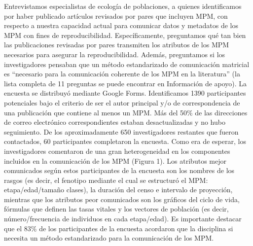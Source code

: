 \documentclass[
]{book}
\theoremstyle{definition}
\theoremstyle{definition}
\theoremstyle{definition}
\theoremstyle{definition}
\theoremstyle{remark}
\begin{document}
Entrevistamos especialistas de ecología de poblaciones, a quienes identificamos por haber publicado artículos revisados por pares que incluyen MPM, con respecto a nuestra capacidad actual para comunicar datos y metadatos de los MPM con fines de reproducibilidad. Específicamente, preguntamos qué tan bien las publicaciones revisadas por pares transmiten los atributos de los MPM necesarios para asegurar la reproducibilidad. Además, preguntamos si los investigadores pensaban que un método estandarizado de comunicación matricial es ``necesario para la comunicación coherente de los MPM en la literatura'' (la lista completa de 11 preguntas se puede encontrar en Información de apoyo). La encuesta se distribuyó mediante Google Forms. Identificamos 1390 participantes potenciales bajo el criterio de ser el autor principal y/o de correspondencia de una publicación que contiene al menos un MPM. Más del 50\% de las direcciones de correo electrónico correspondientes estaban desactualizadas y no hubo seguimiento. De los aproximadamente 650 investigadores restantes que fueron contactados, 60 participantes completaron la encuesta. Como era de esperar, los investigadores comentaron de una gran heterogeneidad en los componentes incluidos en la comunicación de los MPM (Figura 1). Los atributos mejor comunicados según estos participantes de la encuesta son los nombres de los rasgos (es decir, el fenotipo mediante el cual se estructuró el MPM: etapa/edad/tamaño clases), la duración del censo e intervalo de proyección, mientras que los atributos peor comunicados son los gráficos del ciclo de vida, fórmulas que definen las tasas vitales y los vectores de población (es decir, número/frecuencia de individuos en cada etapa/edad). Es importante destacar que el 83\% de los participantes de la encuesta acordaron que la disciplina si necesita un método estandarizado para la comunicación de los MPM.
\end{document}
